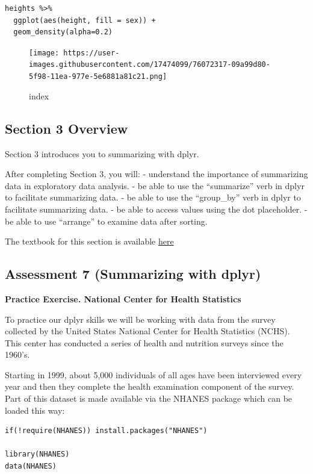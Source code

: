 \documentclass[
]{article}
\begin{document}
\begin{verbatim}
heights %>% 
  ggplot(aes(height, fill = sex)) + 
  geom_density(alpha=0.2) 
\end{verbatim}

\begin{figure}
\centering
\texttt{[image: https://user-images.githubusercontent.com/17474099/76072317-09a99d80-5f98-11ea-977e-5e6881a81c21.png]}
\caption{index}
\end{figure}

\hypertarget{section-3-overview}{%
\subsection{Section 3 Overview}\label{section-3-overview}}

Section 3 introduces you to summarizing with dplyr.

After completing Section 3, you will: - understand the importance of
summarizing data in exploratory data analysis. - be able to use the
``summarize'' verb in dplyr to facilitate summarizing data. - be able to
use the ``group\_by'' verb in dplyr to facilitate summarizing data. - be
able to access values using the dot placeholder. - be able to use
``arrange'' to examine data after sorting.

The textbook for this section is available
\href{https://rafalab.github.io/dsbook/tidyverse.html\#tidy-data}{here}

\hypertarget{assessment-7-summarizing-with-dplyr}{%
\subsection{Assessment 7 (Summarizing with
dplyr)}\label{assessment-7-summarizing-with-dplyr}}

\textbf{Practice Exercise. National Center for Health Statistics}

To practice our dplyr skills we will be working with data from the
survey collected by the United States National Center for Health
Statistics (NCHS). This center has conducted a series of health and
nutrition surveys since the 1960's.

Starting in 1999, about 5,000 individuals of all ages have been
interviewed every year and then they complete the health examination
component of the survey. Part of this dataset is made available via the
NHANES package which can be loaded this way:

\begin{verbatim}
if(!require(NHANES)) install.packages("NHANES")

library(NHANES)
data(NHANES)
\end{verbatim}
\end{document}
